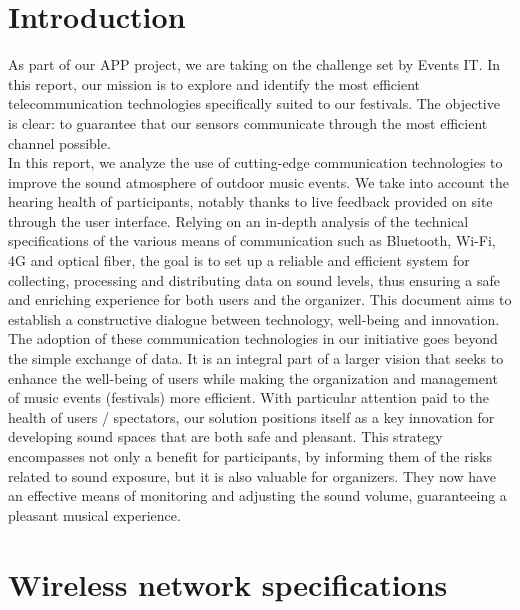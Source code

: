 \documentclass[12]{article}
\begin{document}
\begin{titlepage}

\end{titlepage}

\newpage
\tableofcontents
\listoffigures
\newpage
\clearpage
\setcounter{page}{1}


\section*{Introduction}
As part of our APP project, we are taking on the challenge set by Events IT. In this report, our mission is to explore and identify the most efficient telecommunication technologies specifically suited to our festivals. The objective is clear: to guarantee that our sensors communicate through the most efficient channel possible. \\

In this report, we analyze the use of cutting-edge communication technologies to improve the sound atmosphere of outdoor music events. We take into account the hearing health of participants, notably thanks to live feedback provided on site through the user interface. Relying on an in-depth analysis of the technical specifications of the various means of communication such as Bluetooth, Wi-Fi, 4G and optical fiber, the goal is to set up a reliable and efficient system for collecting, processing and distributing data on sound levels, thus ensuring a safe and enriching experience for both users and the organizer. This document aims to establish a constructive dialogue between technology, well-being and innovation. \\

The adoption of these communication technologies in our initiative goes beyond the simple exchange of data. It is an integral part of a larger vision that seeks to enhance the well-being of users while making the organization and management of music events (festivals) more efficient. With particular attention paid to the health of users / spectators, our solution positions itself as a key innovation for developing sound spaces that are both safe and pleasant. This strategy encompasses not only a benefit for participants, by informing them of the risks related to sound exposure, but it is also valuable for organizers. They now have an effective means of monitoring and adjusting the sound volume, guaranteeing a pleasant musical experience. \\


\section{Wireless network specifications}
\end{document}
